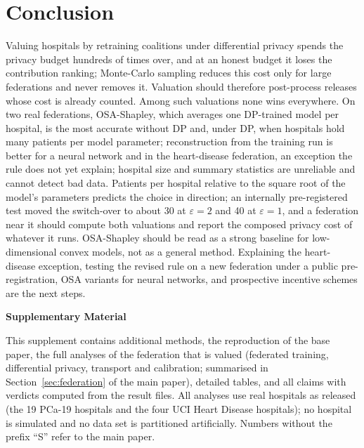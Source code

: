 \documentclass[journal]{IEEEtran}
\begin{document}
\section{Conclusion}
\label{sec:conclusion}
Valuing hospitals by retraining coalitions under differential privacy spends the privacy budget hundreds of times over, and at an honest budget it loses the contribution ranking; Monte-Carlo sampling reduces this cost only for large federations and never removes it. Valuation should therefore post-process releases whose cost is already counted. Among such valuations none wins everywhere. On two real federations, OSA-Shapley, which averages one DP-trained model per hospital, is the most accurate without DP and, under DP, when hospitals hold many patients per model parameter; reconstruction from the training run is better for a neural network and in the heart-disease federation, an exception the rule does not yet explain; hospital size and summary statistics are unreliable and cannot detect bad data. Patients per hospital relative to the square root of the model's parameters predicts the choice in direction; an internally pre-registered test moved the switch-over to about 30 at $\varepsilon=2$ and 40 at $\varepsilon=1$, and a federation near it should compute both valuations and report the composed privacy cost of whatever it runs. OSA-Shapley should be read as a strong baseline for low-dimensional convex models, not as a general method. Explaining the heart-disease exception, testing the revised rule on a new federation under a public pre-registration, OSA variants for neural networks, and prospective incentive schemes are the next steps.




\clearpage
\onecolumn
\begin{center}{\Large\bfseries Supplementary Material}\end{center}
\twocolumn
\setcounter{section}{0}\setcounter{table}{0}\setcounter{figure}{0}\setcounter{equation}{0}
\renewcommand{\thetable}{S\arabic{table}}
\renewcommand{\thefigure}{S\arabic{figure}}
\renewcommand{\thesection}{S\arabic{section}}
\renewcommand{\theequation}{S\arabic{equation}}


This supplement contains additional methods, the reproduction of the base paper, the full analyses of the federation that is valued (federated training, differential privacy, transport and calibration; summarised in Section~\ref{sec:federation} of the main paper), detailed tables, and all claims with verdicts computed from the result files. All analyses use real hospitals as released (the 19 PCa-19 hospitals and the four UCI Heart Disease hospitals); no hospital is simulated and no data set is partitioned artificially. Numbers without the prefix ``S'' refer to the main paper.
\end{document}
